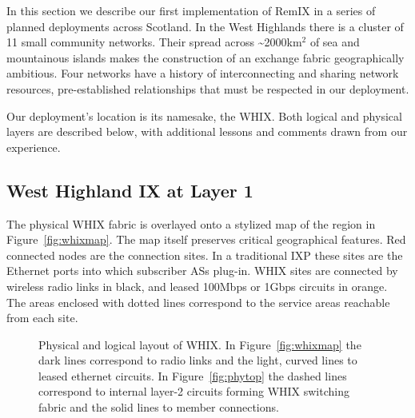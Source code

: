 
In this section we describe our first implementation of RemIX in a series of planned deployments across Scotland. In the West Highlands there
is a cluster of
11 small community networks. Their spread across \textasciitilde 2000km$^2$
of sea and mountainous islands makes the
construction of an exchange fabric geographically ambitious. Four networks have
a history of interconnecting and sharing network resources, pre-established
relationships that must be respected in our deployment.

Our deployment's location is its namesake, the \ac{WHIX}. Both logical
and physical layers are described below, with additional lessons and
comments drawn from our experience.

\subsection{West Highland IX at Layer 1}

The physical \ac{WHIX} fabric is overlayed onto a stylized map of the region in
Figure~\ref{fig:whixmap}. The map itself preserves critical geographical
features. Red connected nodes are the connection sites. In a traditional
\ac{IXP} these sites are the Ethernet ports into which subscriber \acp{AS}
plug-in. WHIX sites are connected by wireless radio links in black, and leased
100Mbps or 1Gbps circuits in orange. The areas enclosed with dotted lines
correspond to the service areas reachable from each site.
\begin{figure*}
  \centering
  \hfil %
  \caption{Physical and logical layout of \ac{WHIX}. In
  Figure~\ref{fig:whixmap} the dark lines correspond to radio links
  and the light, curved lines to leased ethernet circuits.
  In Figure~\ref{fig:phytop} the dashed lines
  correspond to internal layer-2 circuits forming \ac{WHIX}
  switching fabric and the solid lines to member connections.}
\end{figure*}

